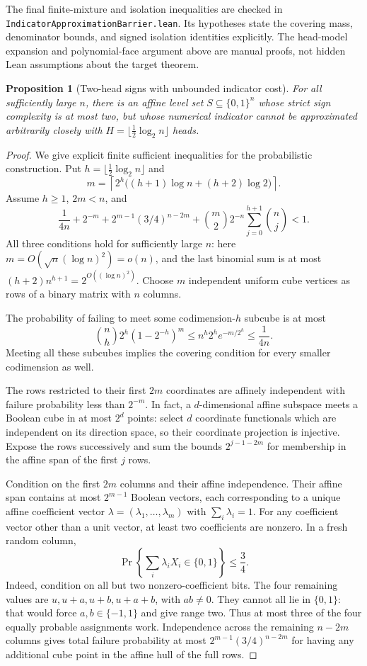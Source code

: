 \documentclass[11pt]{article}
\newtheorem{proposition}{Proposition}
\begin{document}
The final finite-mixture and isolation inequalities are checked in
\texttt{IndicatorApproximationBarrier.lean}. Its hypotheses state
the covering mass, denominator bounds, and signed isolation
identities explicitly. The head-model expansion and polynomial-face
argument above are manual proofs, not hidden Lean assumptions about
the target theorem.

\begin{proposition}[Two-head signs with unbounded indicator cost]
For all sufficiently large $n$, there is an affine level set
$S\subseteq\{0,1\}^n$ whose strict sign complexity is at most two,
but whose numerical indicator cannot be approximated arbitrarily
closely with $H=\lfloor\tfrac12\log_2n\rfloor$ heads.
\end{proposition}
\begin{proof}
We give explicit finite sufficient inequalities for the probabilistic
construction. Put $h=\lfloor\tfrac12\log_2n\rfloor$ and
\[
 m=\left\lceil2^h\big((h+1)\log n+(h+2)\log2\big)\right\rceil.
\]
Assume $h\ge1$, $2m<n$, and
\[
 \frac1{4n}+2^{-m}
 +2^{m-1}(3/4)^{n-2m}
 +\binom m2 2^{-n}\sum_{j=0}^{h+1}\binom nj<1. \tag{*}
\]
All three conditions hold for sufficiently large $n$: here
$m=O(\sqrt n(\log n)^2)=o(n)$, and the last binomial sum is at
most $(h+2)n^{h+1}=2^{O((\log n)^2)}$.
Choose $m$ independent uniform cube vertices as rows of a binary
matrix with $n$ columns.

The probability of failing to meet some codimension-$h$ subcube is
at most
\[
 \binom nh2^h(1-2^{-h})^m
 \le n^h2^h e^{-m/2^h}\le\frac1{4n}.
\]
Meeting all these subcubes implies the covering condition for every
smaller codimension as well.

The rows restricted to their first $2m$ coordinates are affinely
independent with failure probability less than $2^{-m}$. In fact,
a $d$-dimensional affine subspace meets a Boolean cube in at most
$2^d$ points: select $d$ coordinate functionals which are independent
on its direction space, so their coordinate projection is injective.
Expose the rows successively and sum the bounds
$2^{j-1-2m}$ for membership in the affine span of the first $j$ rows.

Condition on the first $2m$ columns and their affine independence.
Their affine span contains at most $2^{m-1}$ Boolean vectors, each
corresponding to a unique affine coefficient vector
$\lambda=(\lambda_1,\ldots,\lambda_m)$ with $\sum_i\lambda_i=1$.
For any coefficient vector other than a unit vector, at least two
coefficients are nonzero. In a fresh random column,
\[
 \Pr\left\{\sum_i\lambda_iX_i\in\{0,1\}\right\}\le\frac34.
\]
Indeed, condition on all but two nonzero-coefficient bits. The four
remaining values are $u,u+a,u+b,u+a+b$, with $ab\ne0$.
They cannot all lie in $\{0,1\}$: that would force
$a,b\in\{-1,1\}$ and give range two. Thus at most three of the
four equally probable assignments work. Independence across the
remaining $n-2m$ columns gives total failure probability at most
$2^{m-1}(3/4)^{n-2m}$ for having any additional cube point in the
affine hull of the full rows.


\end{proof}
\end{document}
